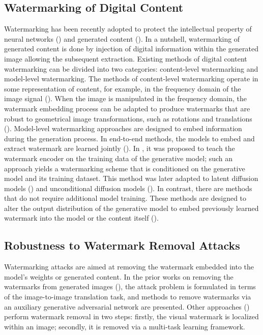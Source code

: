 \subsection{Watermarking of Digital Content}
Watermarking has been recently adopted to protect the intellectual property of neural networks (\cite{wu2020watermarking,pautov2024probabilistically}) and generated content (\cite{kirchenbauer2023watermark,zhaoprovable,fu2024watermarking}). In a nutshell, watermarking of generated content is done by injection of digital information within the generated image allowing the subsequent extraction.  Existing methods of digital content watermarking can be divided into two categories: content-level watermarking and model-level watermarking. The methods of content-level watermarking operate in some representation of content, for example, in the frequency domain of the image signal (\cite{o1996watermarking,cox1996secure}). When the image is manipulated in the frequency domain, the watermark embedding process can be adapted to produce watermarks that are robust to geometrical image transformations, such as rotations and translations (\cite{wen2024tree}). Model-level watermarking approaches are designed to embed information during the generation process. In end-to-end methods, the models to embed and extract watermark are learned jointly (\cite{zhu2018hidden,hayes2017generating}). In \cite{yu2021artificial}, it was proposed to teach the watermark encoder on the training data of the generative model; such an approach yields a watermarking scheme that is conditioned on the generative model and its training dataset. This method was later adapted to latent diffusion models (\cite{fernandez2023stable}) and unconditional diffusion models (\cite{zhao2023recipe}). In contrast, there are methods that do not require additional model training. These methods are designed to alter the output distribution of the generative model to embed previously learned watermark into the model or the content itself (\cite{kirchenbauer2023watermark,wen2024tree}). 


\subsection{Robustness to Watermark Removal Attacks}
Watermarking attacks are aimed at removing the watermark embedded into the model's weights or generated content. In the prior works on removing the watermarks from generated images (\cite{li2019towards,cao2019generative}), the attack problem is formulated in terms of the image-to-image translation task, and methods to remove watermarks via an auxiliary generative adversarial network are presented. Other approaches (\cite{hertz2019blind,liang2021visible,sun2023denet}) perform watermark removal in two steps: firstly, the visual watermark is localized within an image; secondly, it is removed via a multi-task learning framework. 


